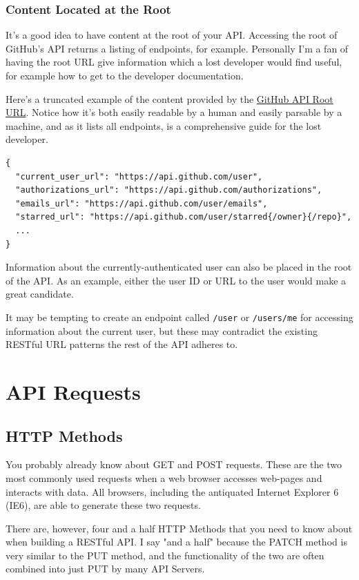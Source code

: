 \documentclass{book}
\begin{document}
\subsection{Content Located at the Root}

It's a good idea to have content at the root of your API. Accessing the root of GitHub's API returns a listing of endpoints, for example. Personally I'm a fan of having the root URL give information which a lost developer would find useful, for example how to get to the developer documentation.

Here's a truncated example of the content provided by the \href{https://api.github.com/}{GitHub API Root URL}. Notice how it's both easily readable by a human and easily parsable by a machine, and as it lists all endpoints, is a comprehensive guide for the lost developer.

\begin{verbatim}
{
  "current_user_url": "https://api.github.com/user",
  "authorizations_url": "https://api.github.com/authorizations",
  "emails_url": "https://api.github.com/user/emails",
  "starred_url": "https://api.github.com/user/starred{/owner}{/repo}",
  ...
}
\end{verbatim}

Information about the currently-authenticated user can also be placed in the root of the API. As an example, either the user ID or URL to the user would make a great candidate.

It may be tempting to create an endpoint called \texttt{/user} or \texttt{/users/me} for accessing information about the current user, but these may contradict the existing RESTful URL patterns the rest of the API adheres to.


\chapter{API Requests}

\section{HTTP Methods}

You probably already know about GET and POST requests. These are the two most commonly used requests when a web browser accesses web-pages and interacts with data. All browsers, including the antiquated Internet Explorer 6 (IE6), are able to generate these two requests.

There are, however, four and a half HTTP Methods that you need to know about when building a RESTful API. I say "and a half" because the PATCH method is very similar to the PUT method, and the functionality of the two are often combined into just PUT by many API Servers.
\end{document}
